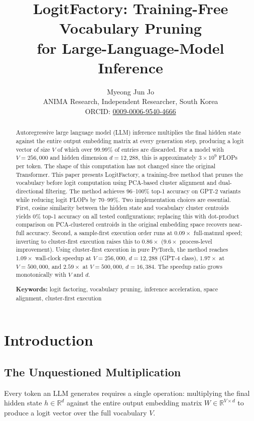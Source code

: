 \documentclass[11pt]{article}
\title{\bfseries LogitFactory: Training-Free Vocabulary Pruning\\
for Large-Language-Model Inference}
\author{Myeong Jun Jo\\
\small ANIMA Research, Independent Researcher, South Korea\\
\small ORCID: \href{https://orcid.org/0009-0006-9540-4666}{0009-0006-9540-4666}}
\date{}
\begin{document}
\maketitle

\begin{abstract}
Autoregressive large language model (LLM) inference multiplies the final hidden state against the entire output embedding matrix at every generation step, producing a logit vector of size $V$ of which over 99.99\% of entries are discarded. For a model with $V = 256{,}000$ and hidden dimension $d = 12{,}288$, this is approximately $3 \times 10^9$ FLOPs per token. The shape of this computation has not changed since the original Transformer. This paper presents LogitFactory, a training-free method that prunes the vocabulary before logit computation using PCA-based cluster alignment and dual-directional filtering. The method achieves 96--100\% top-1 accuracy on GPT-2 variants while reducing logit FLOPs by 70--99\%. Two implementation choices are essential. First, cosine similarity between the hidden state and vocabulary cluster centroids yields 0\% top-1 accuracy on all tested configurations; replacing this with dot-product comparison on PCA-clustered centroids in the original embedding space recovers near-full accuracy. Second, a sample-first execution order runs at $0.09\times$ full-matmul speed; inverting to cluster-first execution raises this to $0.86\times$ ($9.6\times$ process-level improvement). Using cluster-first execution in pure PyTorch, the method reaches $1.09\times$ wall-clock speedup at $V = 256{,}000$, $d = 12{,}288$ (GPT-4 class), $1.97\times$ at $V = 500{,}000$, and $2.59\times$ at $V = 500{,}000$, $d = 16{,}384$. The speedup ratio grows monotonically with $V$ and $d$.

\medskip
\noindent\textbf{Keywords:} logit factoring, vocabulary pruning, inference acceleration, space alignment, cluster-first execution
\end{abstract}

\section{Introduction}

\subsection{The Unquestioned Multiplication}

Every token an LLM generates requires a single operation: multiplying the final hidden state $h \in \mathbb{R}^{d}$ against the entire output embedding matrix $W \in \mathbb{R}^{V \times d}$ to produce a logit vector over the full vocabulary $V$.
\end{document}

